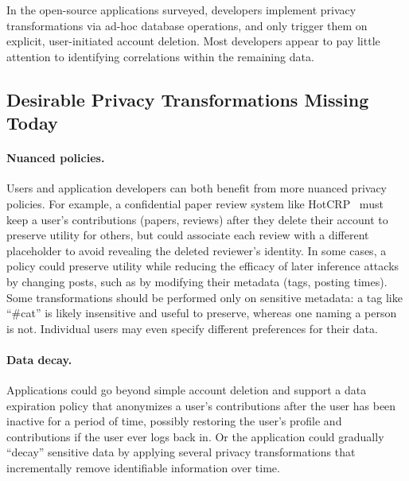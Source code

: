 In the open-source applications surveyed, developers implement privacy transformations
via ad-hoc database operations, and only trigger them on explicit, user-initiated account
deletion.
%
Most developers appear to pay little attention to identifying correlations
within the remaining data.
%


\subsection{Desirable Privacy Transformations Missing Today}

\paragraph{Nuanced policies.}
%
Users and application developers can both benefit from more nuanced privacy policies.
%
For example, a confidential paper review system like HotCRP~\cite{hotcrp} must keep a
user's contributions
(papers, reviews) after they delete their account to preserve utility for others, but could
associate each review with a different placeholder to avoid revealing the deleted reviewer's
identity.
%
In some cases, a policy could preserve utility while reducing the efficacy of later inference
attacks by changing posts, such as by modifying their metadata (\eg tags, posting times).
%
Some transformations should be performed only on sensitive metadata:
a tag like “\#cat” is likely insensitive and useful to preserve, whereas one naming a person is not.
%
%
Individual users may even specify different preferences for their data.
%
%

\paragraph{Data decay.}
%
Applications could go beyond simple account deletion and support a data expiration policy that
anonymizes a user's contributions after the user has been inactive for a period of time,
possibly restoring the user's profile and contributions if the user ever logs back in.
%
Or the application could gradually ``decay'' sensitive data by applying several privacy
transformations that incrementally remove identifiable information over time.
%

